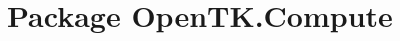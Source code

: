 \hypertarget{namespace_open_t_k_1_1_compute}{\section{Package Open\-T\-K.\-Compute}
\label{namespace_open_t_k_1_1_compute}
}
